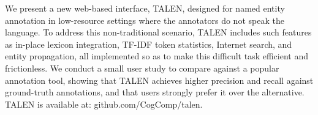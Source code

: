 We present a new web-based interface, TALEN, designed for named entity annotation in low-resource settings where the annotators do not speak the language. To address this non-traditional scenario, TALEN includes such features as in-place lexicon integration, TF-IDF token statistics, Internet search, and entity propagation, all implemented so as to make this difficult task efficient and frictionless. We conduct a small user study to compare against a popular annotation tool, showing that TALEN achieves higher precision and recall against ground-truth annotations, and that users strongly prefer it over the alternative. TALEN is available at: github.com/CogComp/talen.

